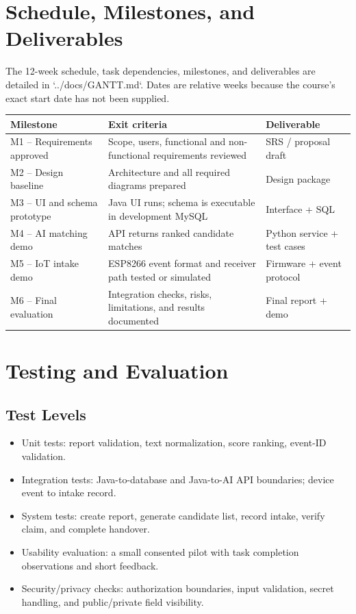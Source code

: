 \documentclass[12pt,a4paper]{report}
\begin{document}
\chapter{Schedule, Milestones, and Deliverables}
The 12-week schedule, task dependencies, milestones, and deliverables are detailed in `../docs/GANTT.md`. Dates are relative weeks because the course's exact start date has not been supplied.

\begin{longtable}{p{}p{}p{}}
\toprule
Milestone & Exit criteria & Deliverable\\\midrule
M1 -- Requirements approved & Scope, users, functional and non-functional requirements reviewed & SRS / proposal draft\\
M2 -- Design baseline & Architecture and all required diagrams prepared & Design package\\
M3 -- UI and schema prototype & Java UI runs; schema is executable in development MySQL & Interface + SQL\\
M4 -- AI matching demo & API returns ranked candidate matches & Python service + test cases\\
M5 -- IoT intake demo & ESP8266 event format and receiver path tested or simulated & Firmware + event protocol\\
M6 -- Final evaluation & Integration checks, risks, limitations, and results documented & Final report + demo\\
\bottomrule
\end{longtable}

\chapter{Testing and Evaluation}
\section{Test Levels}
\begin{itemize}
\item Unit tests: report validation, text normalization, score ranking, event-ID validation.
\item Integration tests: Java-to-database and Java-to-AI API boundaries; device event to intake record.
\item System tests: create report, generate candidate list, record intake, verify claim, and complete handover.
\item Usability evaluation: a small consented pilot with task completion observations and short feedback.
\item Security/privacy checks: authorization boundaries, input validation, secret handling, and public/private field visibility.
\end{itemize}
\end{document}
